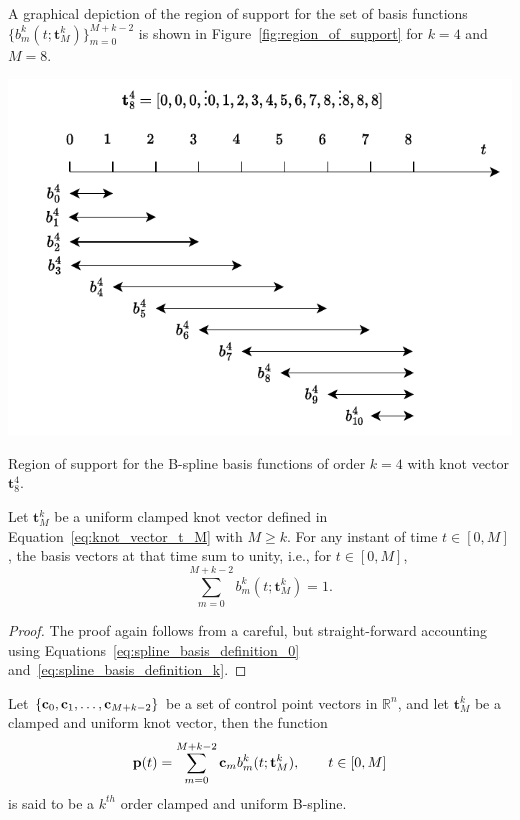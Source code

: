 A graphical depiction of the region of support for the set of basis functions $\{b_m^k(t;\mathbf{t}_M^k)\}_{m=0}^{M+k-2}$ is shown in Figure~\ref{fig:region_of_support} for $k=4$ and $M=8$.
\begin{marginfigure}[0in]
  \includegraphics[width=\linewidth]{./chap5_trajectory_planning/figures/region_of_support}
  \caption{Region of support for the B-spline basis functions of order $k=4$ with knot vector $\mathbf{t}_8^4$.}
  \label{fig:region_of_support}  
\end{marginfigure}

\begin{lemma} \label{lem:basis_vectors_sum_to_1}
	Let $\mathbf{t}_M^k$ be a uniform clamped knot vector defined in Equation~\eqref{eq:knot_vector_t_M} with $M\geq k$. For any instant of time $t\in[0,M]$, the basis vectors at that time sum to unity, i.e., for $t\in[0, M]$,
	\[
	\sum_{m=0}^{M+k-2} b_m^k(t; \mathbf{t}_M^k) = 1.
	\]
\end{lemma}
\begin{proof}  The proof again follows from a careful, but straight-forward accounting using Equations~\eqref{eq:spline_basis_definition_0} and~\eqref{eq:spline_basis_definition_k}.	
\end{proof}

\begin{definition}
Let $\{\mathbf{c}_0, \mathbf{c}_1, \dots, \mathbf{c}_{M+k-2}\}$ be a set of control point vectors in $\mathbb{R}^n$, and let $\mathbf{t}_M^k$ be a clamped and uniform knot vector, then the function 
\begin{equation}\label{eq:clamped_uniform_spline}
\mathbf{p}(t) = \sum_{m=0}^{M+k-2} \cbf_m b_m^k(t; \mathbf{t}_M^k), \qquad t\in[0, M]
\end{equation}
is said to be a $k^{th}$ order clamped and uniform B-spline. 
\end{definition}

